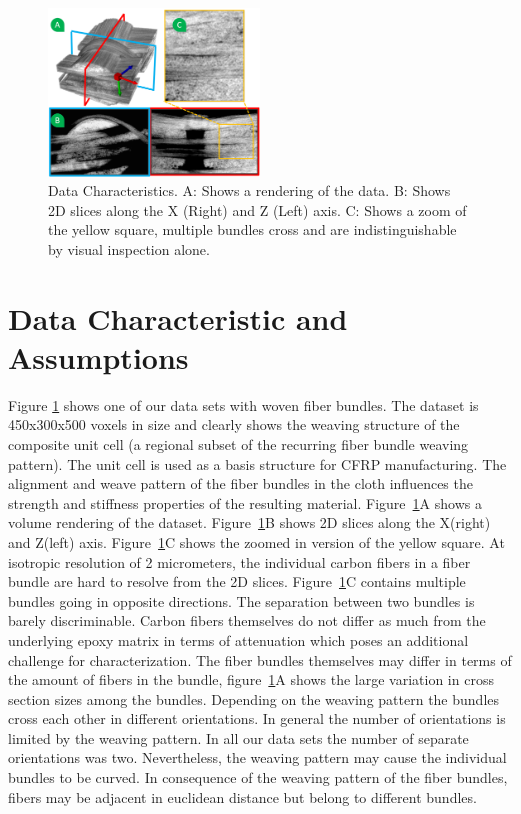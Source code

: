 \begin{figure}
\includegraphics[width=0.5\textwidth,clip=true, trim= 0cm 0cm 0cm 0cm]{imagesMT2014/MT_data_4_2.png}
\caption{Data Characteristics. A: Shows a rendering of the data. B: Shows 2D slices along the X (Right) and Z (Left) axis. C: Shows a zoom of the yellow square, multiple bundles cross and are indistinguishable by visual inspection alone. }
\label{fig:data-char}
\end{figure}
\section {Data Characteristic and Assumptions}
\label{sec:char_data}

Figure \ref{fig:data-char} shows one of our data sets with woven fiber bundles. The dataset is 450x300x500 voxels in size and clearly shows the weaving structure of the composite unit cell (a regional subset of the recurring fiber bundle weaving pattern). The unit cell is used as a basis structure for CFRP manufacturing. The alignment and weave pattern of the fiber bundles in the cloth influences the strength and stiffness properties of the resulting material. Figure~\ref{fig:data-char}A shows a volume rendering of the dataset. Figure~\ref{fig:data-char}B shows 2D slices along the X(right) and Z(left) axis. Figure~\ref{fig:data-char}C shows the zoomed in version of the yellow square. At isotropic resolution of 2 micrometers, the individual carbon fibers in a fiber bundle are hard to resolve from the 2D slices. Figure~\ref{fig:data-char}C contains multiple bundles going in opposite directions. The separation between two bundles is barely discriminable.
Carbon fibers themselves do not differ as much from the underlying epoxy matrix in terms of attenuation which poses an additional challenge for characterization. 
The fiber bundles themselves may differ in terms of the amount of fibers in the bundle, figure~\ref{fig:data-char}A shows the large variation in cross section sizes among the bundles.
Depending on the weaving pattern the bundles cross each other in different orientations. 
In general the number of orientations is limited by the weaving pattern. In all our data sets the number of separate orientations was two. Nevertheless, the weaving pattern may cause the individual bundles to be curved. 
In consequence of the weaving pattern of the fiber bundles, fibers may be adjacent in euclidean distance but belong to different bundles. 
 

